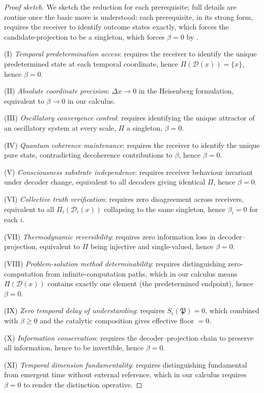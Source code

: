 \documentclass[11pt,a4paper]{article}
\newcommand{\D}{\mathcal{D}}
\newcommand{\Method}{\mathfrak{P}}
\newcommand{\Sfloor}{S_{\flat}}
\begin{document}
\begin{proof}[Proof sketch]
We sketch the reduction for each prerequisite; full details are routine
once the basic move is understood: each prerequisite, in
its strong form, requires the receiver to identify outcome states
exactly, which forces the candidate-projection to be a singleton, which
forces $\beta=0$ by .

(I) \emph{Temporal predetermination access}: requires the receiver to
identify the unique predetermined state at each temporal coordinate,
hence $\Pi(\D(x))=\{x\}$, hence $\beta=0$.

(II) \emph{Absolute coordinate precision}: $\Delta x\to 0$ in the
Heisenberg formulation, equivalent to $\beta\to 0$ in our calculus.

(III) \emph{Oscillatory convergence control}: requires identifying the
unique attractor of an oscillatory system at every scale, $\Pi$ a
singleton, $\beta=0$.

(IV) \emph{Quantum coherence maintenance}: requires the receiver to
identify the unique pure state, contradicting decoherence
contributions to $\beta$, hence $\beta=0$.

(V) \emph{Consciousness substrate independence}: requires receiver
behaviour invariant under decoder change, equivalent to all decoders
giving identical $\Pi$, hence $\beta=0$.

(VI) \emph{Collective truth verification}: requires zero disagreement
across receivers, equivalent to all $\Pi_i(\D_i(x))$ collapsing to
the same singleton, hence $\beta_i=0$ for each $i$.

(VII) \emph{Thermodynamic reversibility}: requires zero information
loss in decoder--projection, equivalent to $\Pi$ being injective and
single-valued, hence $\beta=0$.

(VIII) \emph{Problem-solution method determinability}: requires
distinguishing zero-computation from infinite-computation paths, which
in our calculus means $\Pi(\D(x))$ contains exactly one element
(the predetermined endpoint), hence $\beta=0$.

(IX) \emph{Zero temporal delay of understanding}: requires
$\Sfloor(\Method)=0$, which combined with $\beta\ge 0$ and the
catalytic composition gives effective floor $=0$.

(X) \emph{Information conservation}: requires the decoder--projection
chain to preserve all information, hence to be invertible, hence
$\beta=0$.

(XI) \emph{Temporal dimension fundamentality}: requires distinguishing
fundamental from emergent time without external reference, which in
our calculus requires $\beta=0$ to render the distinction operative.
\end{proof}
\end{document}
